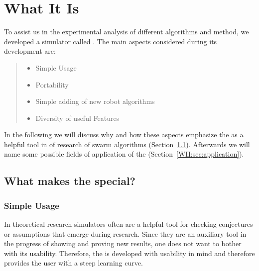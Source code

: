 \chapter{What It Is}

To assist us in the experimental analysis of different algorithms and method, we developed a simulator called \RSS. The main aspects considered during its development are:
\begin{quote}
	\begin{itemize}
		\item Simple Usage
		\item Portability
		\item Simple adding of new robot algorithms
		\item Diversity of useful Features
	\end{itemize}
\end{quote}
In the following we will discuss why and how these aspects emphasize the \RSS as a helpful tool in of research of swarm algorithms (Section~\ref{WII:sec:special}). Afterwards we will name some possible fields of application of the \RSS (Section~\ref{WII:sec:application}).

\section{What makes the \RSS special?}\label{WII:sec:special}

\subsection{Simple Usage}\label{WII:sec:simpleusage}
In theoretical research simulators often are a helpful tool for checking conjectures or assumptions that emerge during research. Since they are an auxiliary tool in the progress of showing and proving new results, one does not want to bother with its usability. Therefore, the \RSS is developed with usability in mind and therefore provides the user with a steep learning curve.\medskip

